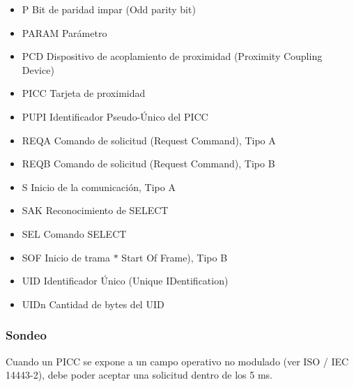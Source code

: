 \begin{itemize}
	\item P Bit de paridad impar (Odd parity bit)\par

	\item PARAM Parámetro\par

	\item PCD Dispositivo de acoplamiento de proximidad (Proximity Coupling Device)\par

	\item PICC Tarjeta de proximidad\par

	\item PUPI Identificador Pseudo-Único del PICC\par

	\item REQA Comando de solicitud (Request Command), Tipo A\par

	\item REQB Comando de solicitud (Request Command), Tipo B\par

	\item S Inicio de la comunicación, Tipo A\par

	\item SAK Reconocimiento de SELECT\par

	\item SEL Comando SELECT\par

	\item SOF Inicio de trama $\ast$ Start Of Frame), Tipo B\par

	\item UID Identificador Único (Unique IDentification)\par

	\item UIDn Cantidad de bytes del UID
\end{itemize}\par

\subsubsection{Sondeo}
Cuando un PICC se expone a un campo operativo no modulado (ver ISO / IEC 14443-2), debe poder aceptar una solicitud dentro de los 5 ms.\par


